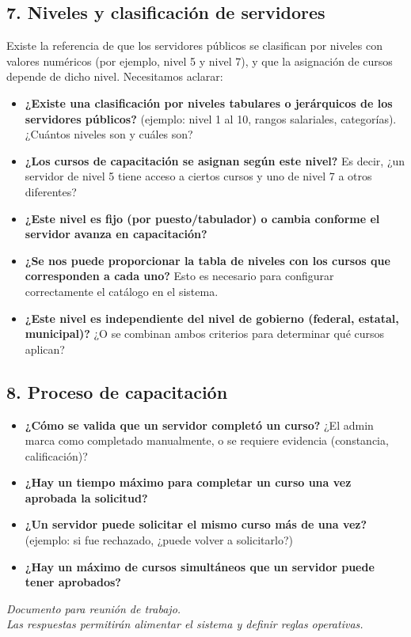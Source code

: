 \documentclass[12pt,letterpaper]{article}
\begin{document}
\subsection{7. Niveles y clasificación de servidores}

Existe la referencia de que los servidores públicos se clasifican por niveles con valores numéricos (por ejemplo, nivel 5 y nivel 7), y que la asignación de cursos depende de dicho nivel. Necesitamos aclarar:

\begin{itemize}
\item \textbf{¿Existe una clasificación por niveles tabulares o jerárquicos de los servidores públicos?} (ejemplo: nivel 1 al 10, rangos salariales, categorías). ¿Cuántos niveles son y cuáles son?

\item \textbf{¿Los cursos de capacitación se asignan según este nivel?} Es decir, ¿un servidor de nivel 5 tiene acceso a ciertos cursos y uno de nivel 7 a otros diferentes?

\item \textbf{¿Este nivel es fijo (por puesto/tabulador) o cambia conforme el servidor avanza en capacitación?}

\item \textbf{¿Se nos puede proporcionar la tabla de niveles con los cursos que corresponden a cada uno?} Esto es necesario para configurar correctamente el catálogo en el sistema.

\item \textbf{¿Este nivel es independiente del nivel de gobierno (federal, estatal, municipal)?} ¿O se combinan ambos criterios para determinar qué cursos aplican?
\end{itemize}

\subsection{8. Proceso de capacitación}

\begin{itemize}
\item \textbf{¿Cómo se valida que un servidor completó un curso?} ¿El admin marca como completado manualmente, o se requiere evidencia (constancia, calificación)?

\item \textbf{¿Hay un tiempo máximo para completar un curso una vez aprobada la solicitud?}

\item \textbf{¿Un servidor puede solicitar el mismo curso más de una vez?} (ejemplo: si fue rechazado, ¿puede volver a solicitarlo?)

\item \textbf{¿Hay un máximo de cursos simultáneos que un servidor puede tener aprobados?}
\end{itemize}

\vfill

\begin{center}
\color{grissuave}\small\itshape
Documento para reunión de trabajo.\\
Las respuestas permitirán alimentar el sistema y definir reglas operativas.
\end{center}
\end{document}
